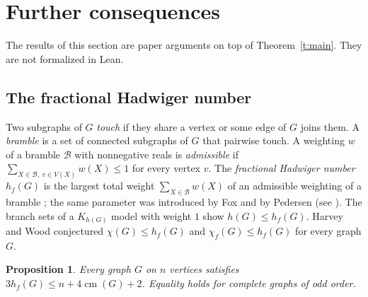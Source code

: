 \documentclass[11pt]{article}
\newtheorem{proposition}[theorem]{Proposition}
\theoremstyle{definition}\newtheorem{conjecture}[theorem]{Conjecture}
\theoremstyle{remark}\newtheorem{remark}[theorem]{Remark}
\newcommand{\cm}{\operatorname{cm}}
\begin{document}
\section{Further consequences}\label{s:further}
The results of this section are paper arguments on top of Theorem~\ref{t:main}. They are not formalized in Lean.

\subsection{The fractional Hadwiger number}
Two subgraphs of $G$ \emph{touch} if they share a vertex or some edge of $G$ joins them. A \emph{bramble} is a set of
connected subgraphs of $G$ that pairwise touch. A weighting $w$ of a bramble $\mathcal B$ with nonnegative reals is
\emph{admissible} if $\sum_{X\in\mathcal B,\ v\in V(X)}w(X)\le1$ for every vertex $v$. The \emph{fractional Hadwiger number}
$h_f(G)$ is the largest total weight $\sum_{X\in\mathcal B}w(X)$ of an admissible weighting of a bramble
\cite[Sections~3 and 11]{HW}; the same parameter was introduced by Fox \cite{Fox11} and by Pedersen (see \cite[Section~11]{HW}).
The branch sets of a $K_{h(G)}$ model with weight $1$ show $h(G)\le h_f(G)$. Harvey and Wood
\cite[Section~12, Conjectures~23 and 24]{HW} conjectured $\chi(G)\le h_f(G)$ and $\chi_f(G)\le h_f(G)$ for every graph $G$.

\begin{proposition}\label{p:hf}
Every graph $G$ on $n$ vertices satisfies $3h_f(G)\le n+4\cm(G)+2$. Equality holds for complete graphs of odd order.
\end{proposition}
\end{document}
